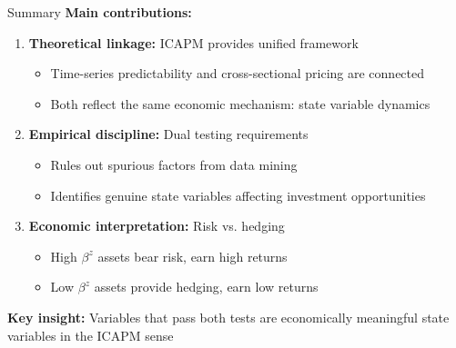 \documentclass{beamer}
\begin{document}
\begin{frame}{Summary}
\textbf{Main contributions:}

\begin{enumerate}
\item \textbf{Theoretical linkage:} ICAPM provides unified framework
\begin{itemize}
\item Time-series predictability and cross-sectional pricing are connected
\item Both reflect the same economic mechanism: state variable dynamics
\end{itemize}
\vspace{0.2cm}

\item \textbf{Empirical discipline:} Dual testing requirements
\begin{itemize}
\item Rules out spurious factors from data mining
\item Identifies genuine state variables affecting investment opportunities
\end{itemize}
\vspace{0.2cm}

\item \textbf{Economic interpretation:} Risk vs. hedging
\begin{itemize}
\item High $\beta^z$ assets bear risk, earn high returns
\item Low $\beta^z$ assets provide hedging, earn low returns
\end{itemize}
\end{enumerate}

\vspace{0.3cm}
\textbf{Key insight:} Variables that pass both tests are economically meaningful state variables in the ICAPM sense
\end{frame}
\end{document}
